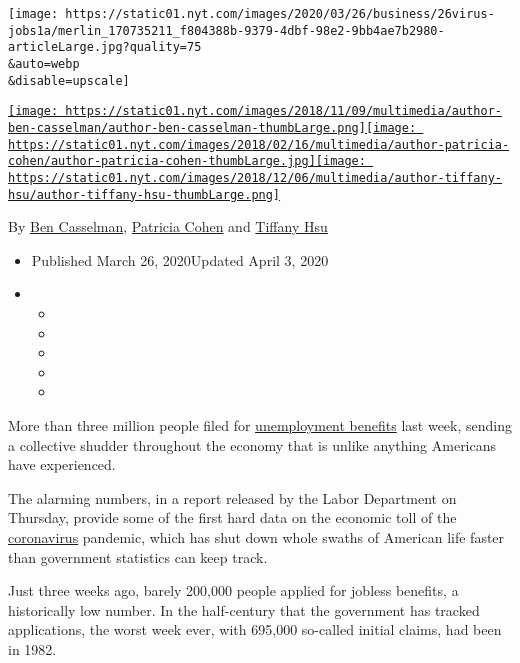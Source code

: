 \texttt{[image: https://static01.nyt.com/images/2020/03/26/business/26virus-jobs1a/merlin\_170735211\_f804388b-9379-4dbf-98e2-9bb4ae7b2980-articleLarge.jpg?quality=75\\\&auto=webp\\\&disable=upscale]}

\href{https://www.nytimes.com/by/ben-casselman}{\texttt{[image: https://static01.nyt.com/images/2018/11/09/multimedia/author-ben-casselman/author-ben-casselman-thumbLarge.png]}}\href{https://www.nytimes.com/by/patricia-cohen}{\texttt{[image: https://static01.nyt.com/images/2018/02/16/multimedia/author-patricia-cohen/author-patricia-cohen-thumbLarge.jpg]}}\href{https://www.nytimes.com/by/tiffany-hsu}{\texttt{[image: https://static01.nyt.com/images/2018/12/06/multimedia/author-tiffany-hsu/author-tiffany-hsu-thumbLarge.png]}}

By \href{https://www.nytimes.com/by/ben-casselman}{Ben Casselman},
\href{https://www.nytimes.com/by/patricia-cohen}{Patricia Cohen} and
\href{https://www.nytimes.com/by/tiffany-hsu}{Tiffany Hsu}

\begin{itemize}
\item
  Published March 26, 2020Updated April 3, 2020
\item
  \begin{itemize}
  \item
  \item
  \item
  \item
  \item
  \end{itemize}
\end{itemize}

More than three million people filed for
\href{https://www.nytimes.com/2020/04/03/upshot/coronavirus-jobless-rate-great-depression.html}{unemployment
benefits} last week, sending a collective shudder throughout the economy
that is unlike anything Americans have experienced.

The alarming numbers, in a report released by the Labor Department on
Thursday, provide some of the first hard data on the economic toll of
the
\href{https://www.nytimes.com/2020/04/03/upshot/coronavirus-jobless-rate-great-depression.html}{coronavirus}
pandemic, which has shut down whole swaths of American life faster than
government statistics can keep track.

Just three weeks ago, barely 200,000 people applied for jobless
benefits, a historically low number. In the half-century that the
government has tracked applications, the worst week ever, with 695,000
so-called initial claims, had been in 1982.

